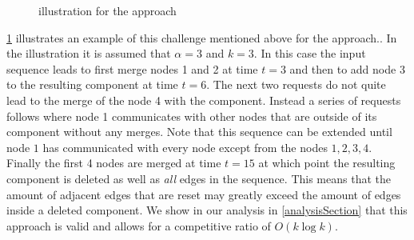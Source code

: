 \documentclass[a4paper,xcolor=dvipsnames, tikz, 12pt]{article}
\newcommand{\adjDel}{\text{A{\scriptsize DJ}-D{\scriptsize EL}}}
\newcommand{\request}[3]{\draw (axis cs:#3,#1) -- node[left]{} (axis cs:#3,#2);}
\theoremstyle{definition}
\begin{document}
	
		\begin{figure}
			\centering
			\caption{illustration for the \adjDel{} approach}\label{exOldCrep}
			
		\end{figure}		
	
	
	
	
	\cref{exOldCrep} illustrates an example of this challenge mentioned above for the \adjDel{} approach.. In the illustration it is assumed that $\alpha=3$ and $k=3$. In this case the input sequence leads \adjDel{} to first merge nodes 1 and 2 at time $t=3$ and then to add node 3 to the resulting component at time $t= 6$. The next two requests do not quite lead to the merge of the node 4 with the component. Instead a series of requests follows where node 1 communicates with other nodes that are outside of its component without any merges. Note that this sequence can be extended until node $1$ has communicated with every node except from the nodes $1,2,3,4$. Finally the first 4 nodes are merged at time $t=15$ at which point the resulting component is deleted as well as \textit{all} edges in the sequence.
	This means that the amount of adjacent edges that are reset may greatly exceed the amount of edges inside a deleted component.
	We show in our analysis in \cref{analysisSection} that this approach is valid and allows for a competitive ratio of $O(k\log k)$.
		
	
	
\end{document}
